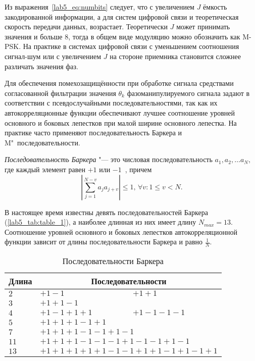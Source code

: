 Из выражения~\eqref{lab5_eq:numbits} следует, что с увеличением $J$ ёмкость закодированной информации, а для систем цифровой связи и теоретическая скорость передачи данных, возрастает. Теоретически $J$ может принимать значения и больше $8$, тогда в общем виде модуляцию можно обозначить как M-PSK. На практике в системах цифровой связи с уменьшением соотношения сигнал-шум или с увеличением $J$ на стороне приемника становится сложнее различать значения фаз. 
	
Для обеспечения помехозащищённости при обработке сигнала средствами согласованной фильтрации значения $\theta_k$ фазоманипулируемого сигнала задают в соответствии с псевдослучайными последовательностями, так как их автокорреляционные функции обеспечивают лучшее соотношение уровней основного и боковых лепестков при малой ширине основного лепестка. На практике часто применяют последовательность Баркера и M"~последовательности.
		
\emph{Последовательность Баркера} "--- это числовая последовательность $a_1, a_2, \ldots a_N,$ где каждый элемент равен $+1$ или $-1$~\cite{Dachnovich}, причем
$$
	\left| \sum\limits_{j=1}^{N-v} a_j a_{j+v} \right| \leq 1,\,\forall v:1 \leq v < N.
$$
	
В настоящее время известны девять последовательностей Баркера (\autoref{lab5_tab:table_1}), а наиболее длинная из них имеет длину $N_{max}=13$. Соотношение уровней основного и боковых лепестков автокорреляционной функции зависит от длины последовательности Баркера и равно $\displaystyle \frac{1}{N}$.

\begin{table}[H]
\caption{Последовательности Баркера}\label{lab5_tab:table_1}
\begin{tabular}{|p{1.2cm}|p{4cm}|p{4cm}|}
\hline
Длина & \multicolumn{2}{c|}{Последовательности} \\ \hline
$2$ & $+1 -1$ & $+1 +1$ \\ \hline
$3$ & \multicolumn{2}{l|}{$+1 +1 -1$} \\ \hline
$4$ & $+1 -1 +1 +1$ & $+1 -1 -1 -1$ \\ \hline
$5$ & \multicolumn{2}{l|}{$+1 +1 +1 -1 +1$} \\ \hline
$7$ & \multicolumn{2}{l|}{$+1 +1 +1 -1 -1 +1 -1$} \\ \hline
$11$ & \multicolumn{2}{l|}{$+1 +1 +1 -1 -1 -1 +1 -1 -1 +1 -1$} \\ \hline
$13$ & \multicolumn{2}{l|}{$+1 +1 +1 +1 +1 -1 -1 +1 +1 -1 +1 -1 +1$} \\ \hline
\end{tabular}
\end{table} 
	
